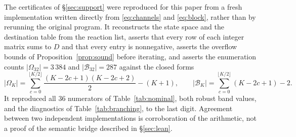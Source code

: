 \documentclass[11pt]{article}
\theoremstyle{plain}
\theoremstyle{definition}
\theoremstyle{remark}
\begin{document}
The certificates of \S\ref{sec:support} were reproduced for this paper from a
fresh implementation written directly from \eqref{eq:channels} and
\eqref{eq:block}, rather than by rerunning the original program. It
reconstructs the state space and the destination table from the reaction
list, asserts that every row of each integer matrix sums to $D$ and that every
entry is nonnegative, asserts the overflow bounds of
Proposition~\ref{prop:sound} before iterating, and asserts the enumeration
counts $|\Omega_{32}|=3\,384$ and $|\mathcal{B}_{32}|=287$ against the closed
forms
\[
|\Omega_K|=\sum_{c=0}^{\lfloor K/2\rfloor}\frac{(K-2c+1)(K-2c+2)}{2}-(K+1),
\qquad
|\mathcal{B}_K|=\sum_{c=0}^{\lfloor K/2\rfloor}(K-2c+1)-2 .
\]
It reproduced all $36$ numerators of Table~\ref{tab:nominal}, both robust band
values, and the diagnostics of Table~\ref{tab:branching},
to the last digit. Agreement between two independent implementations is
corroboration of the arithmetic, not a proof of the semantic bridge described
in \S\ref{sec:lean}.
\end{document}
